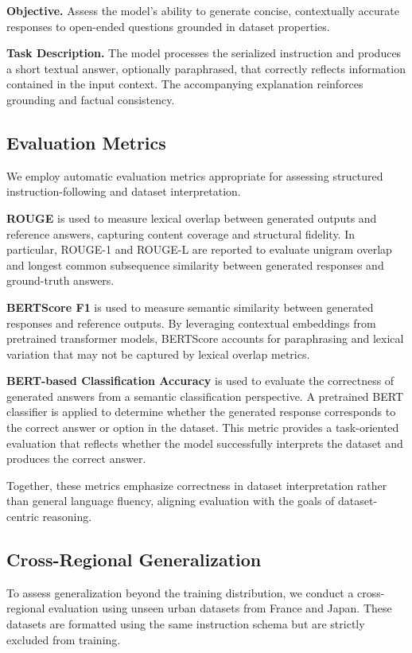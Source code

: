 \documentclass[a4paper,fleqn]{cas-sc}
\begin{document}
\textbf{Objective.}
Assess the model’s ability to generate concise, contextually accurate responses to open-ended questions grounded in dataset properties.

\textbf{Task Description.}
The model processes the serialized instruction and produces a short textual answer, optionally paraphrased, that correctly reflects information contained in the input context.
The accompanying explanation reinforces grounding and factual consistency.

\subsection{Evaluation Metrics}

We employ automatic evaluation metrics appropriate for assessing structured instruction-following and dataset interpretation.

\textbf{ROUGE} is used to measure lexical overlap between generated outputs and reference answers, capturing content coverage and structural fidelity. In particular, ROUGE-1 and ROUGE-L are reported to evaluate unigram overlap and longest common subsequence similarity between generated responses and ground-truth answers.

\textbf{BERTScore F1} is used to measure semantic similarity between generated responses and reference outputs. By leveraging contextual embeddings from pretrained transformer models, BERTScore accounts for paraphrasing and lexical variation that may not be captured by lexical overlap metrics.

\textbf{BERT-based Classification Accuracy} is used to evaluate the correctness of generated answers from a semantic classification perspective. A pretrained BERT classifier is applied to determine whether the generated response corresponds to the correct answer or option in the dataset. This metric provides a task-oriented evaluation that reflects whether the model successfully interprets the dataset and produces the correct answer.

Together, these metrics emphasize correctness in dataset interpretation rather than general language fluency, aligning evaluation with the goals of dataset-centric reasoning.

\subsection{Cross-Regional Generalization}

To assess generalization beyond the training distribution, we conduct a cross-regional evaluation using unseen urban datasets from France and Japan.
These datasets are formatted using the same instruction schema but are strictly excluded from training.
\end{document}
